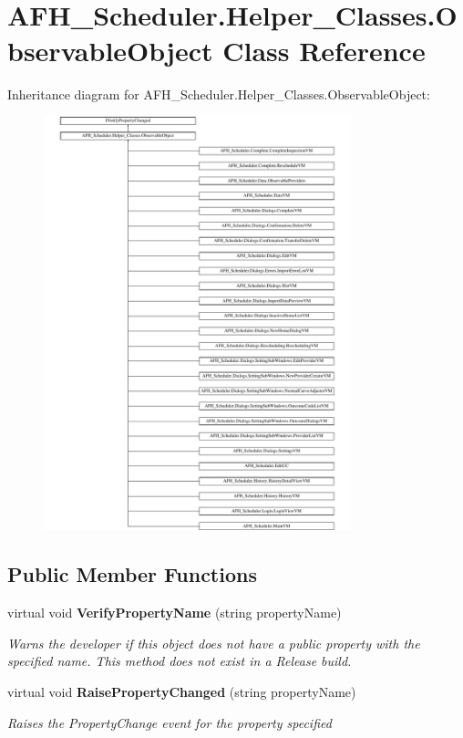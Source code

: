 \section{A\+F\+H\+\_\+\+Scheduler.\+Helper\+\_\+\+Classes.\+Observable\+Object Class Reference}
\label{class_a_f_h___scheduler_1_1_helper___classes_1_1_observable_object}
Inheritance diagram for A\+F\+H\+\_\+\+Scheduler.\+Helper\+\_\+\+Classes.\+Observable\+Object\+:\begin{figure}[H]
\begin{center}
\leavevmode
\includegraphics[height=12.000000cm]{class_a_f_h___scheduler_1_1_helper___classes_1_1_observable_object}
\end{center}
\end{figure}
\subsection*{Public Member Functions}
\begin{DoxyCompactItemize}
\item 
virtual void \textbf{ Verify\+Property\+Name} (string property\+Name)
\begin{DoxyCompactList}\small\item\em Warns the developer if this object does not have a public property with the specified name. This method does not exist in a Release build. \end{DoxyCompactList}\item 
virtual void \textbf{ Raise\+Property\+Changed} (string property\+Name)
\begin{DoxyCompactList}\small\item\em Raises the Property\+Change event for the property specified \end{DoxyCompactList}\end{DoxyCompactItemize}
